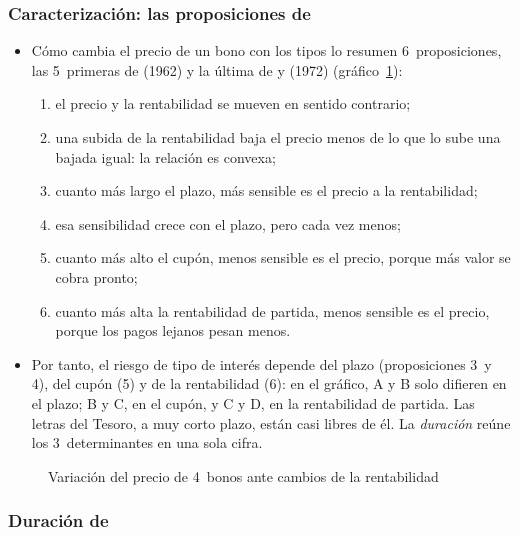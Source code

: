 \documentclass[11pt]{article}
\begin{document}
\subsubsection{Caracterización: las proposiciones de }\label{sec:malkiel}

\begin{itemize}
\item Cómo cambia el precio de un bono con los tipos lo resumen 6~proposiciones, las 5~primeras de  (1962)\nocite{Malkiel1962Expectations} y la última de  y  (1972)\nocite{HomerLiebowitz1972Inside,BodieKaneMarcus2021Investments} (gráfico~\ref{fig:malkiel-bonos}):
  \begin{enumerate}
  \item el precio y la rentabilidad se mueven en sentido contrario;
  \item una subida de la rentabilidad baja el precio menos de lo que lo sube una bajada igual: la relación es convexa;
  \item cuanto más largo el plazo, más sensible es el precio a la rentabilidad;
  \item esa sensibilidad crece con el plazo, pero cada vez menos;
  \item cuanto más alto el cupón, menos sensible es el precio, porque más valor se cobra pronto;
  \item cuanto más alta la rentabilidad de partida, menos sensible es el precio, porque los pagos lejanos pesan menos.
  \end{enumerate}
\item Por tanto, el riesgo de tipo de interés depende del plazo (proposiciones 3~y 4), del cupón (5) y de la rentabilidad (6): en el gráfico, A y B solo difieren en el plazo; B y C, en el cupón, y C y D, en la rentabilidad de partida. Las letras del Tesoro, a muy corto plazo, están casi libres de él. La \emph{duración} reúne los 3~determinantes en una sola cifra.
\end{itemize}

\begin{figure}[H]
\centering
\caption{Variación del precio de 4~bonos ante cambios de la rentabilidad}\label{fig:malkiel-bonos}
\end{figure}

\subsubsection{Duración de }\label{sec:macaulay}
\end{document}
